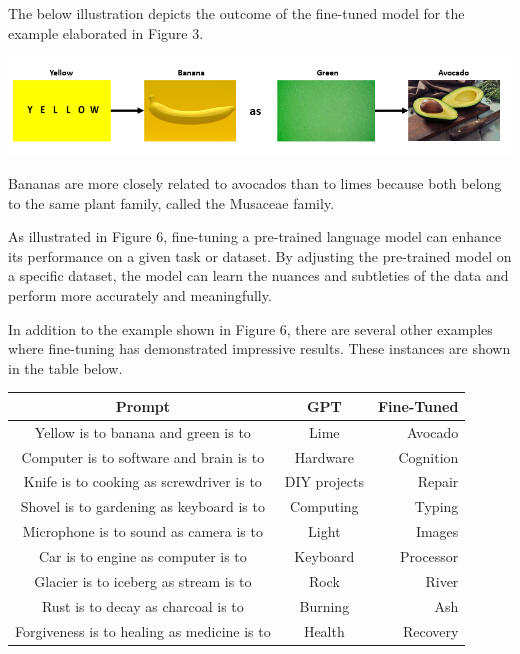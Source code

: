 \documentclass[a0,landscape]{a0poster}
\begin{document}
\begin{multicols}{4}
\color{black}
The below illustration depicts the outcome of the fine-tuned model for the example elaborated in Figure 3.

\begin{center}\vspace{1cm}
\includegraphics[width=0.99\linewidth]{Example2.png}
\end{center}\vspace{1cm}

Bananas are more closely related to avocados than to limes because both belong to the same plant family, called the Musaceae family.
\vspace{0.5cm}

As illustrated in Figure 6, fine-tuning a pre-trained language model can enhance its performance on a given task or dataset. By adjusting the pre-trained model on a specific dataset, the model can learn the nuances and subtleties of the data and perform more accurately and meaningfully.
\vspace{0.5cm}

In addition to the example shown in Figure 6, there are several other examples where fine-tuning has demonstrated impressive results. These instances are shown in the table below.

 \begin{center}\vspace{1cm}
\centering
\begin{tabular}{c|c|r}
\toprule
\textbf{Prompt}  &  \textbf{GPT}  & \textbf{Fine-Tuned} \\
\midrule
Yellow is to banana and green is to  &    Lime  & Avocado\\ \hline
Computer is to software and brain is to   &   Hardware   & Cognition\\ \hline
Knife is to cooking as screwdriver is to  &   DIY projects  & Repair \\ \hline
Shovel is to gardening as keyboard is to &   Computing   & Typing\\ \hline
Microphone is to sound as camera is to &    Light  & Images\\ \hline
Car is to engine as computer is to &   Keyboard   & Processor\\ \hline
Glacier is to iceberg as stream is to &   Rock   & River \\ \hline
Rust is to decay as charcoal is to &   Burning   & Ash\\ \hline
Forgiveness is to healing as medicine is to &   Health    & Recovery \\ \hline
\bottomrule
\end{tabular}
\end{center}\vspace{1cm}



\end{multicols}
\end{document}
